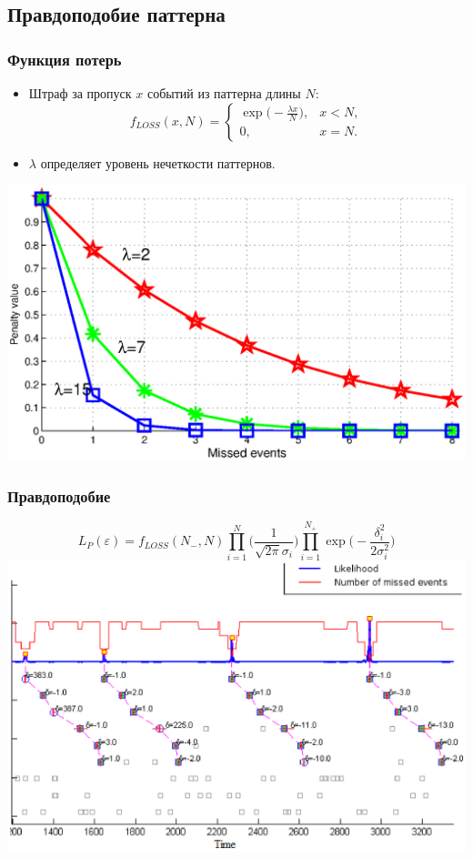 \documentclass[smaller]{beamer}
\begin{document}
\begin{frame}
\begin{left}
\begin{tabular}[t]{p{12em}|p{12em}}
\end{tabular}
\end{left}
\end{frame}  

\subsection{Правдоподобие паттерна}
\begin{frame}
  \frametitle{Функция потерь}
  \begin{itemize}
  \item Штраф за пропуск $x$ событий из паттерна длины $N$:
  $$
  f_{LOSS}(x,N)= \begin{cases}
   \exp\bigl(-\frac{\lambda x}{N}\bigr), & x < N, \\
   0,                                    & x=N.
   \end{cases}
  $$
  \item $\lambda$ определяет уровень нечеткости паттернов.
   \end{itemize}
   \includegraphics[scale=0.35]{MB_LF.eps}
\end{frame}

\begin{frame}
  \frametitle{Правдоподобие}
   $$L_P(\varepsilon)=f_{LOSS}(N_-,N)\prod_{i=1}^{N}\biggl( \frac1{\sqrt{2\pi}\sigma_i }\biggr)  \prod_{i=1}^{N_+}\exp\biggl(- \frac{\delta_i^2}{2\sigma_i^2}\biggr) $$
   \includegraphics[scale=0.4]{norm_12_of_14.eps}
\end{frame}
\end{document}
